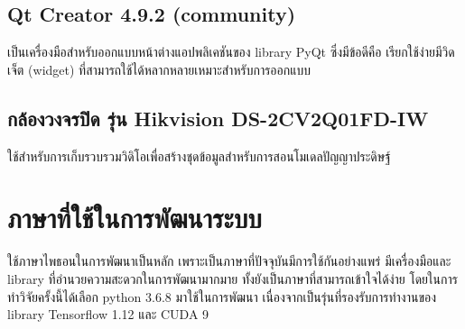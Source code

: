 \subsection*{Qt Creator 4.9.2 (community)}
เป็นเครื่องมือสำหรับออกแบบหน้าต่างแอปพลิเคชันของ library PyQt ซึ่งมีข้อดีคือ เรียกใช้ง่ายมีวิดเจ็ต (widget) ที่สามารถใช้ได้หลากหลายเหมาะสำหรับการออกแบบ

\subsection*{กล้องวงจรปิด รุ่น Hikvision DS-2CV2Q01FD-IW}
ใช้สำหรับการเก็บรวบรวมวิดิโอเพื่อสร้างชุดข้อมูลสำหรับการสอนโมเดลปัญญาประดิษฐ์
\clearpage
\section{ภาษาที่ใช้ในการพัฒนาระบบ} 
	ใช้ภาษาไพธอนในการพัฒนาเป็นหลัก เพราะเป็นภาษาที่ปัจจุบันมีการใช้กันอย่างแพร่ มีเครื่องมือและ library ที่อำนวยความสะดวกในการพัฒนามากมาย 
	ทั้งยังเป็นภาษาที่สามารถเข้าใจได้ง่าย โดยในการทำวิจัยครั้งนี้ได้เลือก python 3.6.8 มาใช้ในการพัฒนา 
	เนื่องจากเป็นรุ่นที่รองรับการทำงานของ library Tensorflow 1.12 และ CUDA 9
\vspace{3mm}
